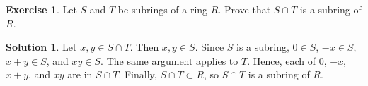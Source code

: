 \documentclass{article}
\theoremstyle{definition}
\newtheorem{exercise}{Exercise}
\newtheorem*{solution}{Solution}
\begin{document}
\begin{exercise}
    Let \(S\) and \(T\) be subrings of a ring \(R\). Prove that \(S\cap T\) is a subring of \(R\).
\end{exercise}
\begin{solution}
        Let \(x,y\in S\cap T\). Then \(x,y\in S\). Since \(S\) is a subring, \(0\in S\), \(-x\in S\), \(x+y\in S\), and \(xy\in S\). The same argument applies to \(T\). Hence, each of 0, \(-x\), \(x+y\), and \(xy\) are in \(S\cap T\). Finally, \(S\cap T\subset R\), so \(S\cap T\) is a subring of \(R\).
\end{solution}
\end{document}
